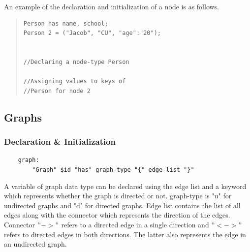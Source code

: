 \documentclass[a4paper]{article}
\begin{document}
\begin{large}
An example of the declaration and initialization of a node is as follows.

\begin{multicols}{2}
\begin{quote}
\begin{verbatim}
Person has name, school;
Person 2 = ("Jacob", "CU", "age":"20");


//Declaring a node-type Person

//Assigning values to keys of 
//Person for node 2
\end{verbatim}
\end{quote}
\end{multicols}

\subsection{Graphs}
\subsubsection{Declaration \& Initialization}
\begin{verbatim}
    graph:
        "Graph" $id "has" graph-type "{" edge-list "}"
\end{verbatim}

\indent A variable of graph data type can be declared using the edge list and a keyword which represents whether the graph is directed or not. 
graph-type is "u" for undirected graphs and "d" for directed graphs. 
Edge list contains the list of all edges along with the connector which represents the direction of the edges. Connector $"->"$ refers to a directed edge in a single direction and $"<->"$ refers to directed edges in both directions. The latter also represents the edge in an undirected graph.

\end{large}
\end{document}

